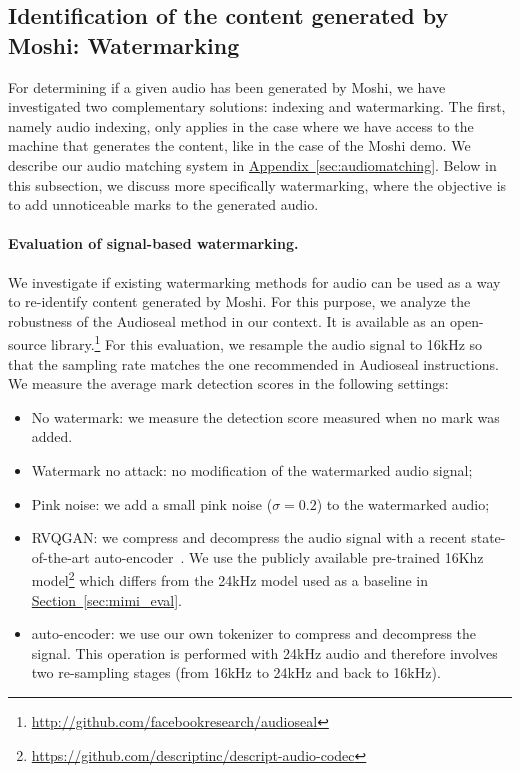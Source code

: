 \subsection{Identification of the content generated by Moshi: Watermarking}
\label{sec:watermarking}

For determining if a given audio has been generated by Moshi, we have investigated two complementary solutions: indexing and watermarking. The first, namely audio indexing, only applies in the case where we have access to the machine that generates the content, like in the case of the Moshi demo. We describe our audio matching system in \hyperref[sec:audiomatching]{Appendix~\ref{sec:audiomatching}}. 
Below in this subsection, we discuss more specifically watermarking, where the objective is to add unnoticeable marks to the generated audio. 

\paragraph{Evaluation of signal-based watermarking.}

We investigate if existing watermarking methods for audio can be used as a way to re-identify content generated by Moshi. For this purpose, we analyze the robustness of the Audioseal method \citep{san2024proactive} in our context. It is available as an open-source library.\footnote{\url{http://github.com/facebookresearch/audioseal}} 
For this evaluation, we resample the audio signal to 16kHz so that the sampling rate matches the one recommended in Audioseal instructions. We measure the average mark detection scores in the following settings:
\begin{itemize}
    \item No watermark: we measure the detection score measured when no mark was added. \\[-1.7em]
    \item Watermark no attack: no modification of the watermarked audio signal; \\[-1.7em]
    \item Pink noise: we add a small pink noise ($\sigma=0.2$) to the watermarked audio; \\[-1.7em]
    \item RVQGAN: we compress and decompress the audio signal with a recent state-of-the-art auto-encoder~\citep{dac}. We use the publicly available pre-trained 16Khz model\footnote{\url{https://github.com/descriptinc/descript-audio-codec}} which differs from the 24kHz model used as a baseline in \hyperref[sec:mimi_eval]{Section~\ref{sec:mimi_eval}}.\\[-1.7em]
    \item \mimi{} auto-encoder: we use our own tokenizer to compress and decompress the signal. This operation is performed with 24kHz audio and therefore involves two re-sampling stages (from 16kHz to 24kHz and back to 16kHz). 
\end{itemize}

